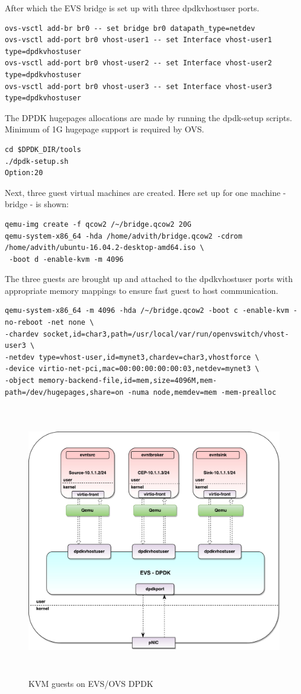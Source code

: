 After which the EVS bridge is set up with three dpdkvhostuser ports.
\begin{lstlisting}
ovs-vsctl add-br br0 -- set bridge br0 datapath_type=netdev
ovs-vsctl add-port br0 vhost-user1 -- set Interface vhost-user1 type=dpdkvhostuser
ovs-vsctl add-port br0 vhost-user2 -- set Interface vhost-user2 type=dpdkvhostuser 
ovs-vsctl add-port br0 vhost-user3 -- set Interface vhost-user3 type=dpdkvhostuser 
\end{lstlisting}

The DPDK hugepages allocations are made by running the dpdk-setup scripts. Minimum of 1G hugepage support is required by OVS.
\begin{lstlisting}
cd $DPDK_DIR/tools
./dpdk-setup.sh
Option:20
\end{lstlisting}

Next, three guest virtual machines are created. Here set up for one machine - bridge - is shown:
\begin{lstlisting}
qemu-img create -f qcow2 /~/bridge.qcow2 20G
qemu-system-x86_64 -hda /home/advith/bridge.qcow2 -cdrom /home/advith/ubuntu-16.04.2-desktop-amd64.iso \
 -boot d -enable-kvm -m 4096
\end{lstlisting}


The three guests are brought up and attached to the dpdkvhostuser ports with appropriate memory mappings to ensure fast guest to host communication.

\begin{lstlisting}
qemu-system-x86_64 -m 4096 -hda /~/bridge.qcow2 -boot c -enable-kvm -no-reboot -net none \
-chardev socket,id=char3,path=/usr/local/var/run/openvswitch/vhost-user3 \
-netdev type=vhost-user,id=mynet3,chardev=char3,vhostforce \
-device virtio-net-pci,mac=00:00:00:00:00:03,netdev=mynet3 \
-object memory-backend-file,id=mem,size=4096M,mem-path=/dev/hugepages,share=on -numa node,memdev=mem -mem-prealloc
\end{lstlisting}

 \begin{figure}[H]
 \centering
 \caption{KVM guests on EVS/OVS DPDK}
 \includegraphics[height=12cm]{evsdpdk04.pdf}
\end{figure}


